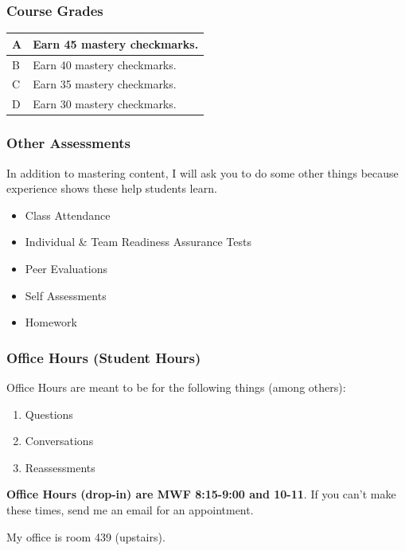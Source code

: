 \documentclass[aspectration=1610]{beamer}
\begin{document}
\begin{frame}\frametitle{Course Grades}

\begin{center}
\begin{tabular}{ll} \hline
A & Earn 45 mastery checkmarks.\\ \hline
B & Earn 40 mastery checkmarks. \\ \hline
C & Earn 35 mastery checkmarks.\\ \hline
D & Earn 30 mastery checkmarks. \\ \hline
\end{tabular}
\end{center}

\end{frame}


\begin{frame}\frametitle{Other Assessments}
In addition to mastering content, I will ask you to do some other things because experience shows these help students learn.
\begin{itemize}
\item Class Attendance
\item Individual \& Team Readiness Assurance Tests
\item Peer Evaluations
\item Self Assessments
\item Homework
\end{itemize}
\end{frame}






\begin{frame}\frametitle{Office Hours (Student Hours)}
Office Hours are meant to be for the following things (among others):
\begin{enumerate}
\item Questions
\item Conversations
\item Reassessments
\end{enumerate}

\vspace{0.2in}

{\bf Office Hours (drop-in) are MWF 8:15-9:00 and 10-11}.  If you can't make these times, send me an email for an appointment.

\vspace{0.1in}
My office is room 439 (upstairs).

\end{frame}
\end{document}
